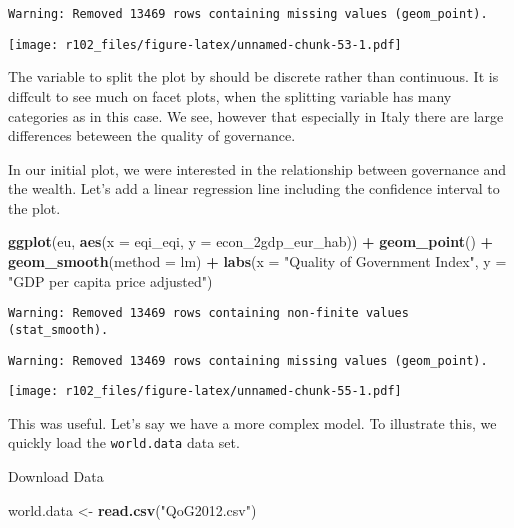 \documentclass[]{article}
\newenvironment{Shaded}{\begin{snugshade}}{\end{snugshade}}
\newcommand{\DataTypeTok}[1]{\textcolor[rgb]{0.13,0.29,0.53}{#1}}
\newcommand{\KeywordTok}[1]{\textcolor[rgb]{0.13,0.29,0.53}{\textbf{#1}}}
\newcommand{\NormalTok}[1]{#1}
\newcommand{\OperatorTok}[1]{\textcolor[rgb]{0.81,0.36,0.00}{\textbf{#1}}}
\newcommand{\StringTok}[1]{\textcolor[rgb]{0.31,0.60,0.02}{#1}}
\begin{document}
\begin{verbatim}
Warning: Removed 13469 rows containing missing values (geom_point).
\end{verbatim}

\texttt{[image: r102\_files/figure-latex/unnamed-chunk-53-1.pdf]}

The variable to split the plot by should be discrete rather than continuous. It is diffcult to see much on facet plots, when the splitting variable has many categories as in this case. We see, however that especially in Italy there are large differences beteween the quality of governance.

In our initial plot, we were interested in the relationship between governance and the wealth. Let's add a linear regression line including the confidence interval to the plot.

\begin{Shaded}
\begin{Highlighting}[]
\KeywordTok{ggplot}\NormalTok{(eu, }\KeywordTok{aes}\NormalTok{(}\DataTypeTok{x =}\NormalTok{ eqi_eqi, }\DataTypeTok{y =}\NormalTok{ econ_2gdp_eur_hab)) }\OperatorTok{+}\StringTok{ }
\StringTok{  }\KeywordTok{geom_point}\NormalTok{() }\OperatorTok{+}
\StringTok{  }\KeywordTok{geom_smooth}\NormalTok{(}\DataTypeTok{method =}\NormalTok{ lm) }\OperatorTok{+}
\StringTok{    }\KeywordTok{labs}\NormalTok{(}\DataTypeTok{x =} \StringTok{"Quality of Government Index"}\NormalTok{, }\DataTypeTok{y =} \StringTok{"GDP per capita price adjusted"}\NormalTok{)}
\end{Highlighting}
\end{Shaded}

\begin{verbatim}
Warning: Removed 13469 rows containing non-finite values (stat_smooth).
\end{verbatim}

\begin{verbatim}
Warning: Removed 13469 rows containing missing values (geom_point).
\end{verbatim}

\texttt{[image: r102\_files/figure-latex/unnamed-chunk-55-1.pdf]}

This was useful. Let's say we have a more complex model. To illustrate this, we quickly load the \texttt{world.data} data set.

Download Data

\begin{Shaded}
\begin{Highlighting}[]
\NormalTok{world.data <-}\StringTok{ }\KeywordTok{read.csv}\NormalTok{(}\StringTok{"QoG2012.csv"}\NormalTok{)}
\end{Highlighting}
\end{Shaded}
\end{document}
